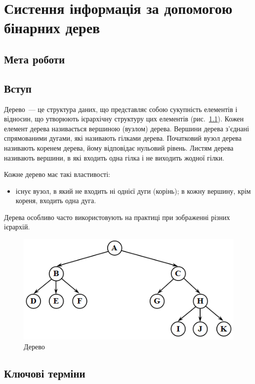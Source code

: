 \chapter{Систення інформація за допомогою бінарних дерев}
\nopagebreak[4]
\section*{Мета роботи}

\nopagebreak[4]
\section{Вступ}
\nopagebreak[4]
Дерево~--- це структура даних, що представляє собою сукупність елементів і відносин, що утворюють ієрархічну структуру цих елементів (рис.~\ref{f:tree1}). Кожен елемент дерева називається вершиною (вузлом) дерева. Вершини дерева з'єднані спрямованими дугами, які називають гілками дерева. Початковий вузол дерева називають коренем дерева, йому відповідає нульовий рівень. Листям дерева називають вершини, в які входить одна гілка і не виходить жодної гілки.

Кожне дерево має такі властивості:
\begin{itemize}
\item існує вузол, в який не входить ні однієї дуги (корінь);
    в кожну вершину, крім кореня, входить одна дуга.
\end{itemize}


Дерева особливо часто використовують на практиці при зображенні різних ієрархій.

\begin{figure}
\caption{Дерево}\label{f:tree1}
\includegraphics[width=13cm]{pic/31_01.png}

\end{figure}

\section{Ключові терміни}
\nopagebreak[4]





